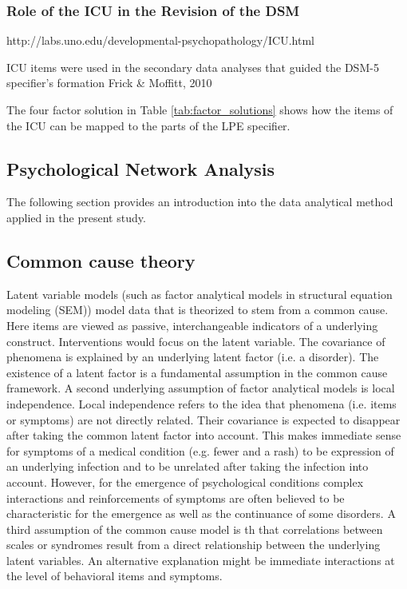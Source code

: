 \subsubsection{Role of the ICU in the Revision of the DSM}
http://labs.uno.edu/developmental-psychopathology/ICU.html

ICU items were used in the secondary data analyses that guided the DSM-5 specifier's formation
Frick \& Moffitt, 2010 

The four factor solution in Table \ref{tab:factor_solutions} shows how the items of the ICU can be mapped to the parts of the LPE specifier.

\subsection{Psychological Network Analysis}

The following section provides an introduction into the data analytical method applied in the present study.

\subsection{Common cause theory}
Latent variable models (such as factor analytical models in structural equation modeling (SEM)) model data that is theorized to stem from a common cause.
Here items are viewed as passive, interchangeable indicators of a underlying construct.
Interventions would focus on the latent variable.
The covariance of phenomena is explained by an underlying latent factor (i.e. a disorder).
The existence of a latent factor is a fundamental assumption in the common cause framework.
A second underlying assumption of factor analytical models is local independence. 
Local independence refers to the idea that phenomena (i.e. items or symptoms) are not directly related.
Their covariance is expected to disappear after taking the common latent factor into account.
This makes immediate sense for symptoms of a medical condition (e.g. fewer and a rash) to be expression of an underlying infection and to be unrelated after taking the infection into account. 
However, for the emergence of psychological conditions complex interactions and reinforcements of symptoms are often believed to be characteristic for the emergence as well as the continuance of some disorders.
A third assumption of the common cause model is th that correlations between scales or syndromes result from a direct relationship between the underlying latent variables. An alternative explanation might be immediate interactions at the level of behavioral items and symptoms.   

